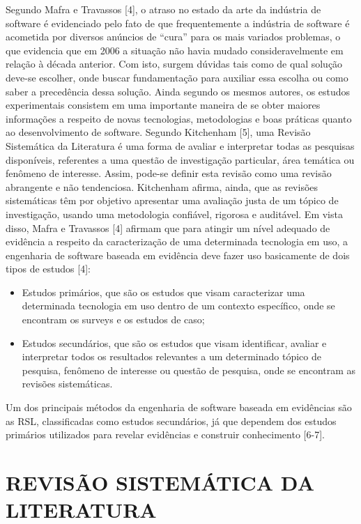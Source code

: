 Segundo Mafra e Travassos [4], o atraso no estado da arte da indústria de software é evidenciado pelo fato de que frequentemente a indústria de software é acometida por diversos anúncios de “cura” para os mais variados problemas, o que evidencia que em 2006 a situação não havia mudado consideravelmente em relação à década anterior. Com isto, surgem dúvidas tais como de qual solução deve-se escolher, onde buscar fundamentação para auxiliar essa escolha ou como saber a precedência dessa solução. Ainda segundo os mesmos autores, os estudos experimentais consistem em uma importante maneira de se obter maiores informações a respeito de novas tecnologias, metodologias e boas práticas quanto ao desenvolvimento de software. 
Segundo Kitchenham [5], uma Revisão Sistemática da Literatura é uma forma de avaliar e interpretar todas as pesquisas disponíveis, referentes a uma questão de investigação particular, área temática ou fenômeno de interesse. Assim, pode-se definir esta revisão como uma revisão abrangente e não tendenciosa. Kitchenham afirma, ainda, que as revisões sistemáticas têm por objetivo apresentar uma avaliação justa de um tópico de investigação, usando uma metodologia confiável, rigorosa e auditável. 
Em vista disso, Mafra e Travassos [4] afirmam que para atingir um nível adequado de evidência a respeito da caracterização de uma determinada tecnologia em uso, a engenharia de software baseada em evidência deve fazer uso basicamente de dois tipos de estudos [4]:

\begin{itemize}
    \item Estudos primários, que são os estudos que visam caracterizar uma determinada tecnologia em uso dentro de um contexto específico, onde se encontram os surveys e os estudos de caso;
    \item Estudos secundários, que são os estudos que visam identificar, avaliar e interpretar todos os resultados relevantes a um determinado tópico de pesquisa, fenômeno de interesse ou questão de pesquisa, onde se encontram as revisões sistemáticas.
\end{itemize}

Um dos principais métodos da engenharia de software baseada em evidências são as RSL, classificadas como estudos secundários, já que dependem dos estudos primários utilizados para revelar evidências e construir conhecimento [6-7].


\section{REVISÃO SISTEMÁTICA DA LITERATURA}

